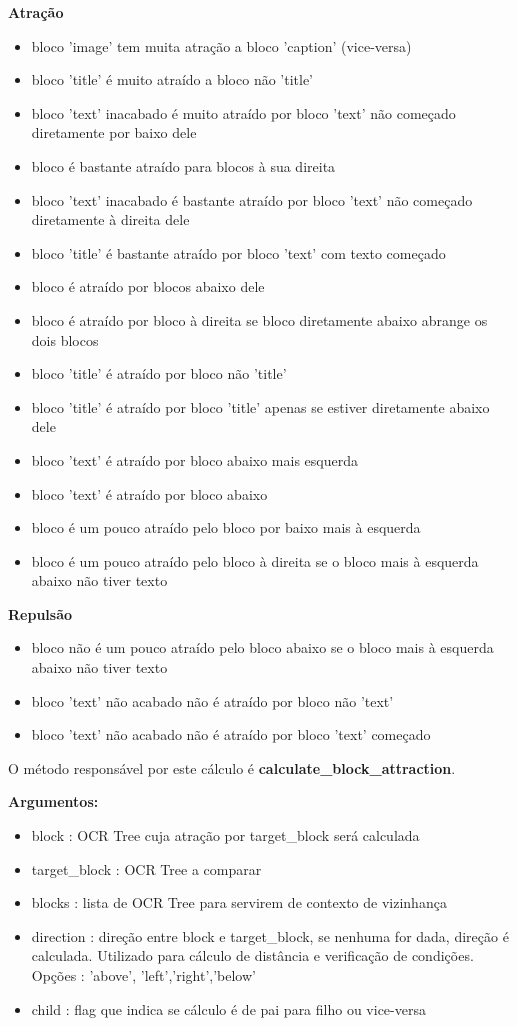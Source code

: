 \textbf{Atração}
\begin{itemize}\setlength\itemsep{-0.3em}
	\item bloco 'image' tem muita atração a bloco 'caption' (vice-versa)
	\item bloco 'title' é muito atraído a bloco não 'title'
	\item bloco 'text' inacabado é muito atraído por bloco 'text' não começado diretamente por baixo dele
	\item bloco é bastante atraído para blocos à sua direita
	\item bloco 'text' inacabado é bastante atraído por bloco 'text' não começado diretamente à direita dele
	\item bloco 'title' é bastante atraído por bloco 'text' com texto começado
	\item bloco é atraído por blocos abaixo dele
	\item bloco é atraído por bloco à direita se bloco diretamente abaixo abrange os dois blocos
	\item bloco 'title' é atraído por bloco não 'title'
	\item bloco 'title' é atraído por bloco 'title' apenas se estiver diretamente abaixo dele
	\item bloco 'text' é atraído por bloco abaixo mais esquerda
	\item bloco 'text' é atraído por bloco abaixo
	\item bloco é um pouco atraído pelo bloco por baixo mais à esquerda
	\item bloco é um pouco atraído pelo bloco à direita se o bloco mais à esquerda abaixo não tiver texto
\end{itemize}

\textbf{Repulsão}
\begin{itemize}\setlength\itemsep{-0.3em}
	\item bloco não é um pouco atraído pelo bloco abaixo se o bloco mais à esquerda abaixo não tiver texto
	\item bloco 'text' não acabado não é atraído por bloco não 'text'
	\item bloco 'text' não acabado não é atraído por bloco 'text' começado
\end{itemize}

O método responsável por este cálculo é \textbf{calculate\_block\_attraction}.

\textbf{Argumentos:}
\begin{itemize}\setlength\itemsep{-0.3em}
	\item block : OCR Tree cuja atração por target\_block será calculada
	\item target\_block : OCR Tree a comparar
	\item blocks : lista de OCR Tree para servirem de contexto de vizinhança
	\item direction : direção entre block e target\_block, se nenhuma for dada, direção é calculada. Utilizado para cálculo de distância e verificação de condições. Opções : 'above', 'left','right','below'
	\item child : flag que indica se cálculo é de pai para filho ou vice-versa
\end{itemize}



